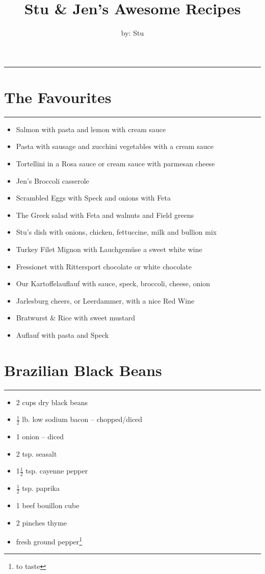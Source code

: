 \documentclass[12pt]{article}
\title{Stu \& Jen's Awesome Recipes}
\author{by: Stu}
\def \hzline{\noindent \rule[0mm]{\textwidth}{1pt}}
\begin{document}
\maketitle
\hzline

\section*{The Favourites} \hzline
\begin{itemize}
  \item Salmon with pasta and lemon with cream sauce
  \item Pasta with sausage and zucchini vegetables with a cream sauce
  \item Tortellini in a Rosa sauce or cream sauce with parmesan cheese
  \item Jen's Broccoli casserole
  \item Scrambled Eggs with Speck and onions with Feta
  \item The Greek salad with Feta and walnuts and Field greens
  \item Stu's dish with onions, chicken, fettuccine, milk and bullion mix 
  \item Turkey Filet Mignon with Lauchgem\"use a sweet white wine
  \item Fressionet with Rittersport chocolate or white chocolate
  \item Our Kartoffelauflauf with sauce, speck, broccoli, cheese, onion
  \item Jarlesburg cheers, or Leerdammer, with a nice Red Wine
  \item Bratwurst \& Rice with sweet mustard
  \item Auflauf with pasta and Speck
\end{itemize}

\newpage
\section*{Brazilian Black Beans} \hzline
\begin{itemize}
  \item 2 cups dry black beans
  \item $\frac{1}{2}$ lb. low sodium bacon -- chopped/diced
  \item 1 onion -- diced
  \item 2 tsp. seasalt
  \item 1$\frac{1}{2}$ tsp. cayenne pepper
  \item $\frac{1}{2}$ tsp. paprika
  \item 1 beef bouillon cube
  \item 2 pinches thyme
  \item fresh ground pepper\footnote{to taste}
\end{itemize}
\end{document}
